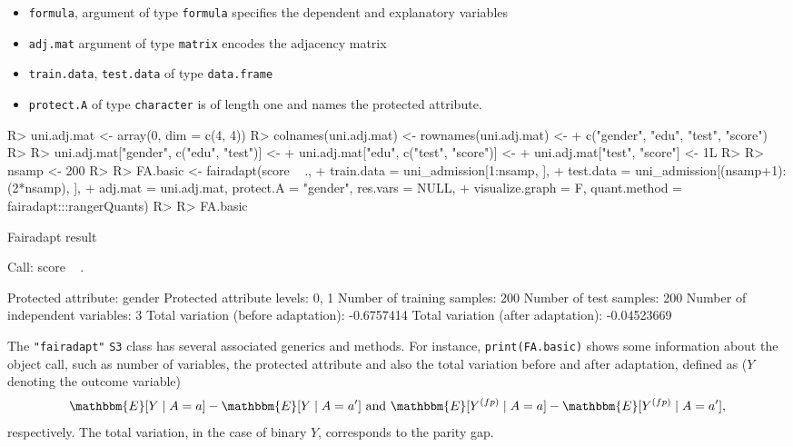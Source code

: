 \documentclass[
  notitle]{jss}
\providecommand{\tightlist}{%
  \setlength{\itemsep}{0pt}\setlength{\parskip}{0pt}}
\begin{document}
\begin{itemize}
\tightlist
\item
  \texttt{formula}, argument of type \texttt{formula} specifies the
  dependent and explanatory variables
\item
  \texttt{adj.mat} argument of type \texttt{matrix} encodes the
  adjacency matrix
\item
  \texttt{train.data}, \texttt{test.data} of type \texttt{data.frame}
\item
  \texttt{protect.A} of type \texttt{character} is of length one and
  names the protected attribute.
\end{itemize}

\begin{CodeChunk}
\begin{CodeInput}
R> uni.adj.mat <- array(0, dim = c(4, 4))
R> colnames(uni.adj.mat) <- rownames(uni.adj.mat) <-
+   c("gender", "edu", "test", "score")
R> 
R> uni.adj.mat["gender", c("edu", "test")] <-
+   uni.adj.mat["edu", c("test", "score")] <-
+   uni.adj.mat["test", "score"] <- 1L
R> 
R> nsamp <- 200
R> 
R> FA.basic <- fairadapt(score ~ .,
+   train.data = uni_admission[1:nsamp, ],
+   test.data = uni_admission[(nsamp+1):(2*nsamp), ],
+   adj.mat = uni.adj.mat, protect.A = "gender", res.vars = NULL,
+   visualize.graph = F, quant.method = fairadapt:::rangerQuants)
R> 
R> FA.basic
\end{CodeInput}
\begin{CodeOutput}
Fairadapt result

Call:
 score ~ . 

Protected attribute:                  gender 
Protected attribute levels:           0, 1 
Number of training samples:           200 
Number of test samples:               200 
Number of independent variables:      3 
Total variation (before adaptation):  -0.6757414 
Total variation (after adaptation):   -0.04523669 
\end{CodeOutput}
\end{CodeChunk}

The \texttt{"fairadapt"} \texttt{S3} class has several associated
generics and methods. For instance, \texttt{print(FA.basic)} shows some
information about the object call, such as number of variables, the
protected attribute and also the total variation before and after
adaptation, defined as (\(Y\) denoting the outcome variable)
\[\mathbbm{E}[Y \mid A = a] - \mathbbm{E}[Y \mid A = a'] \text{ and } \mathbbm{E}[ {Y}^{(fp)} \mid A = a] - \mathbbm{E}[ {Y}^{(fp)} \mid A = a'],\]
respectively. The total variation, in the case of binary \(Y\),
corresponds to the parity gap.
\end{document}

